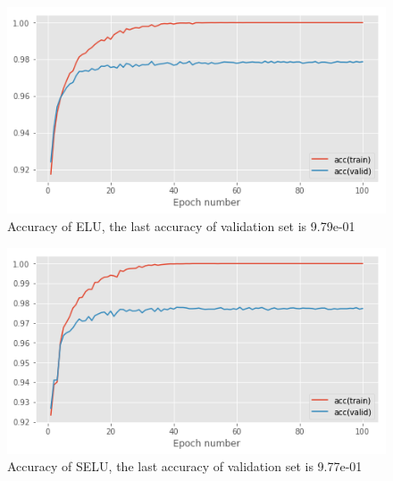 \documentclass{article}
\begin{document}
\begin{figure}[tb]
\vskip 5mm
\begin{center}
\centerline{\includegraphics[width=\columnwidth]{elu2a.png}}
\caption{Accuracy of ELU, the last accuracy of validation set is 9.79e-01}
\label{fig:sample-graph}
\end{center}
\vskip -5mm
\end{figure}
\begin{figure}[tb]
\vskip 5mm
\begin{center}
\centerline{\includegraphics[width=\columnwidth]{selu2a.png}}
\caption{Accuracy of SELU, the last accuracy of validation set is 9.77e-01}
\label{fig:sample-graph}
\end{center}
\vskip -5mm
\end{figure}
\end{document}
